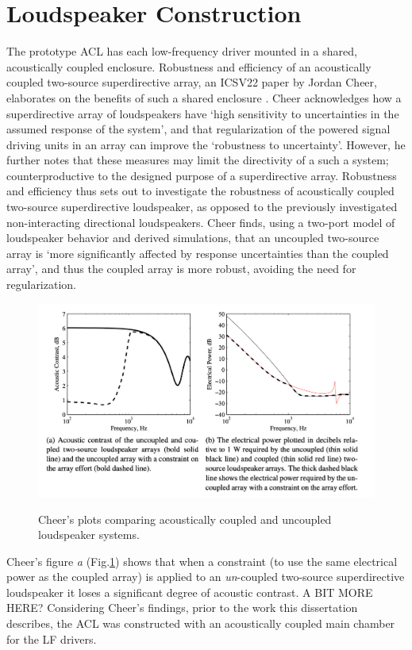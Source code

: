 \documentclass{report}
\begin{document}
    \section{Loudspeaker Construction}
        The prototype ACL has each low-frequency driver mounted in a shared, acoustically coupled enclosure.
        Robustness and efficiency of an acoustically coupled two-source superdirective array, an ICSV22 paper by Jordan Cheer, elaborates on the benefits of such a shared enclosure \cite{cheer2015robustness}.
        Cheer acknowledges how a superdirective array of loudspeakers have `high sensitivity to uncertainties in the assumed response of the system', and that regularization of the powered signal driving units in an array can improve the `robustness to uncertainty'.
        However, he further notes that these measures may limit the directivity of a such a system; counterproductive to the designed purpose of a superdirective array.
        Robustness and efficiency thus sets out to investigate the robustness of acoustically coupled two-source superdirective loudspeaker, as opposed to the previously investigated non-interacting directional loudspeakers.
        Cheer finds, using a two-port model of loudspeaker behavior and derived simulations, that an uncoupled two-source array is `more significantly affected by response uncertainties than the coupled array', and thus the coupled array is more robust, avoiding the need for regularization.
        \begin{figure}[H]
            \centering
            \includegraphics[scale=0.5]{figs/cheerGraph.png}%
            \caption{Cheer's plots comparing acoustically coupled and uncoupled loudspeaker systems.}\cite{cheer2015robustness}
            \label{cheerGraph}
        \end{figure}
        Cheer's figure \textit{a} (Fig.\ref{cheerGraph}) shows that when a constraint (to use the same electrical power as the coupled array) is applied to an \textit{un}-coupled two-source superdirective loudspeaker it loses a significant degree of acoustic contrast.
        A BIT MORE HERE?
        Considering Cheer's findings, prior to the work this dissertation describes, the ACL was constructed with an acoustically coupled main chamber for the LF drivers.
\end{document}
